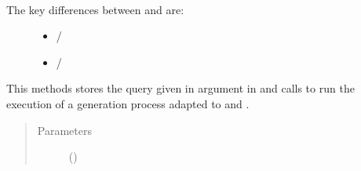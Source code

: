 \documentclass[letterpaper,10pt,english]{sphinxmanual}
\begin{document}
\begin{fulllineitems}
\begin{fulllineitems}
\label{\detokenize{index:Generator.Generator.process_query}}~\begin{description}
\item[{The key differences between {\hyperref[\detokenize{index:Generator.Generator}]{}} and {\hyperref[\detokenize{index:Generator.GenerationHandler}]{}} are:}] \leavevmode\begin{itemize}
\item {} 
{\hyperref[\detokenize{index:Generator.Generator.receive_query}]{}} / {\hyperref[\detokenize{index:Generator.GenerationHandler.receive_query}]{}}

\item {} 
{\hyperref[\detokenize{index:Generator.Generator.process_query}]{}} / {\hyperref[\detokenize{index:Generator.GenerationHandler.process_query}]{}}

\end{itemize}

\end{description}

This methods stores the query given in argument in  and calls {\hyperref[\detokenize{index:Generator.Generator.generation_matching_query}]{}} to run the execution of a generation process adapted to  and .
\begin{quote}\begin{description}
\item[{Parameters}] \leavevmode
{} ({\hyperref[\detokenize{index:Query.Query}]{}}) \textendash{} 

\end{description}\end{quote}

\end{fulllineitems}



\end{fulllineitems}
\end{document}
